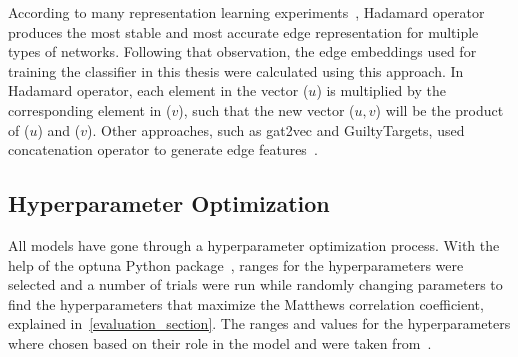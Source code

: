 According to many representation learning experiments~\cite{grover_node2vec:_2016, tsitsulin_verse:_2018, yuan_sne:_2017}, Hadamard operator produces the most stable and most accurate edge representation for multiple types of networks.
Following that observation, the edge embeddings used for training the classifier in this thesis were calculated using this approach.
In Hadamard operator, each element in the vector ($u$) is multiplied by the corresponding element in ($v$), such that the new vector ($u,v$) will be the product of ($u$) and ($v$).
Other approaches, such as gat2vec and GuiltyTargets, used concatenation operator to generate edge features~\cite{muslu_guiltytargets:_2019, sheikh_gat2vec:_2018}.

\subsection{Hyperparameter Optimization}

All models have gone through a hyperparameter optimization process.
With the help of the optuna Python package~\cite{akiba_optuna:_2019}, ranges for the hyperparameters were selected and a number of trials were run while randomly changing parameters to find the hyperparameters that maximize the Matthews correlation coefficient, explained in~\ref{evaluation_section}.
The ranges and values for the hyperparameters where chosen based on their role in the model and were taken from~\cite{yue_graph_2019}.

